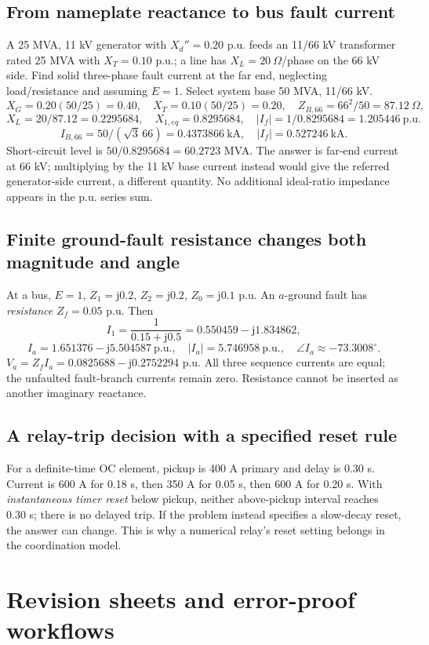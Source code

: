 \documentclass[11pt,a4paper]{article}
\newcommand{\chapterstart}[2]{\clearpage\section{#1}\label{#2}}
\newcommand{\ans}[1]{\boxed{#1}}
\newcommand{\jj}{\mathrm j}
\begin{document}
\subsection{From nameplate reactance to bus fault current}
A 25 MVA, 11 kV generator with $X_d''=0.20$ p.u. feeds an 11/66 kV transformer rated 25 MVA with $X_T=0.10$ p.u.; a line has $X_L=20\ \Omega$/phase on the 66 kV side. Find solid three-phase fault current at the far end, neglecting load/resistance and assuming $E=1$. Select system base 50 MVA, 11/66 kV.
\[
 X_G=0.20(50/25)=0.40,\quad X_T=0.10(50/25)=0.20,\quad
 Z_{B,66}=66^2/50=87.12\ \Omega,
\]
\[
 X_L=20/87.12=0.2295684,\quad X_{1,eq}=0.8295684,\quad
 |I_f|=1/0.8295684=1.205446\ \mathrm{p.u.}
\]
\[
 I_{B,66}=50/(\sqrt3\,66)=0.4373866\ \mathrm{kA},\quad
 \ans{|I_f|=0.527246\ \mathrm{kA}}.
\]
Short-circuit level is $50/0.8295684=60.2723$ MVA. The answer is far-end current at 66 kV; multiplying by the 11 kV base current instead would give the referred generator-side current, a different quantity. No additional ideal-ratio impedance appears in the p.u. series sum.
\subsection{Finite ground-fault resistance changes both magnitude and angle}
At a bus, $E=1$, $Z_1=\jj0.2$, $Z_2=\jj0.2$, $Z_0=\jj0.1$ p.u. An $a$-ground fault has \emph{resistance} $Z_f=0.05$ p.u. Then
\[
 I_1=\frac1{0.15+\jj0.5}=0.550459-\jj1.834862,
\]
\[
 \ans{I_a=1.651376-\jj5.504587\ \mathrm{p.u.}},\quad
 |I_a|=5.746958\ \mathrm{p.u.},\quad \angle I_a\approx-73.3008^\circ.
\]
$V_a=Z_fI_a=0.0825688-\jj0.2752294$ p.u. All three sequence currents are equal; the unfaulted fault-branch currents remain zero. Resistance cannot be inserted as another imaginary reactance.
\subsection{A relay-trip decision with a specified reset rule}
For a definite-time OC element, pickup is 400 A primary and delay is 0.30 s. Current is 600 A for 0.18 s, then 350 A for 0.05 s, then 600 A for 0.20 s. With \emph{instantaneous timer reset} below pickup, neither above-pickup interval reaches 0.30 s; there is no delayed trip. If the problem instead specifies a slow-decay reset, the answer can change. This is why a numerical relay's reset setting belongs in the coordination model.

\chapterstart{Revision sheets and error-proof workflows}{revision}
\end{document}
